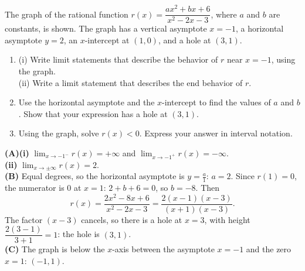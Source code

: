\documentclass[11pt]{article}
\begin{document}
\begin{exo}{}
The graph of the rational function $r(x)=\dfrac{ax^2+bx+6}{x^2-2x-3}$, where $a$ and $b$ are constants, is shown. The graph has a vertical asymptote $x=-1$, a horizontal asymptote $y=2$, an $x$-intercept at $(1,0)$, and a hole at $(3,1)$.
\begin{center}
\end{center}
\begin{enumerate}[label=(\Alph*)]
\item (i) Write limit statements that describe the behavior of $r$ near $x=-1$, using the graph.\\
(ii) Write a limit statement that describes the end behavior of $r$.
\item Use the horizontal asymptote and the $x$-intercept to find the values of $a$ and $b$. Show that your expression has a hole at $(3,1)$.
\item Using the graph, solve $r(x)<0$. Express your answer in interval notation.
\end{enumerate}
\begin{solution}
\textbf{(A)(i)} $\displaystyle\lim_{x\to-1^-}r(x)=+\infty$ and $\displaystyle\lim_{x\to-1^+}r(x)=-\infty$.\\
\textbf{(ii)} $\displaystyle\lim_{x\to\pm\infty}r(x)=2$.\\
\textbf{(B)} Equal degrees, so the horizontal asymptote is $y=\frac a1$: $a=2$. Since $r(1)=0$, the numerator is $0$ at $x=1$: $2+b+6=0$, so $b=-8$. Then
\[r(x)=\frac{2x^2-8x+6}{x^2-2x-3}=\frac{2(x-1)(x-3)}{(x+1)(x-3)}.\]
The factor $(x-3)$ cancels, so there is a hole at $x=3$, with height $\dfrac{2(3-1)}{3+1}=1$: the hole is $(3,1)$.\\
\textbf{(C)} The graph is below the $x$-axis between the asymptote $x=-1$ and the zero $x=1$: $(-1,1)$.
\end{solution}
\end{exo}
\end{document}
